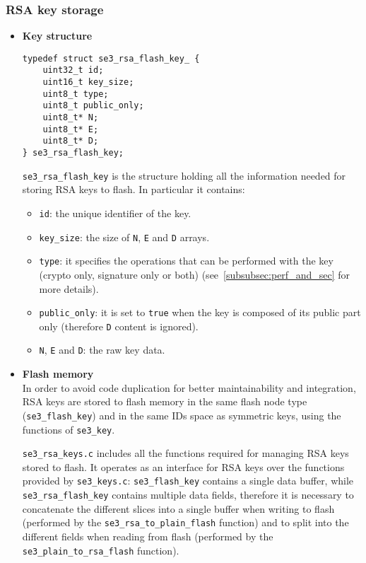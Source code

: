\subsubsection{RSA key storage}
\begin{itemize}
	\item \textbf{Key structure}
		\begin{lstlisting}
typedef struct se3_rsa_flash_key_ {
	uint32_t id;
	uint16_t key_size;
	uint8_t type;
	uint8_t public_only;
	uint8_t* N;
	uint8_t* E;
	uint8_t* D;
} se3_rsa_flash_key;
		\end{lstlisting}
		\texttt{se3\_rsa\_flash\_key} is the structure holding all the
		information needed for storing RSA keys to flash.
		In particular it contains:
		\begin{itemize}
			\item \texttt{id}: the unique identifier of the key.
			\item \texttt{key\_size}: the size of \texttt{N},
				\texttt{E} and \texttt{D} arrays.
			\item \texttt{type}: it specifies the operations that
				can be performed with the key (crypto only,
				signature only or both)
				(see~\ref{subsubsec:perf_and_sec} for more
				details).
			\item \texttt{public\_only}: it is set to \texttt{true}
				when the key is composed of its public part
				only (therefore \texttt{D} content is ignored).
			\item \texttt{N}, \texttt{E} and \texttt{D}: the raw key
				data.
		\end{itemize}

	\item \textbf{Flash memory} \\
		In order to avoid code duplication for better maintainability
		and integration, RSA keys are stored to flash memory in the same
		flash node type (\texttt{se3\_flash\_key}) and in the same IDs
		space as symmetric keys, using the functions of
		\texttt{se3\_key}.

		\bigskip
		\texttt{se3\_rsa\_keys.c} includes all the functions required
		for managing RSA keys stored to flash.
		It operates as an interface for RSA keys over the functions
		provided by \texttt{se3\_keys.c}: \texttt{se3\_flash\_key}
		contains a single data buffer, while
		\texttt{se3\_rsa\_flash\_key} contains multiple data fields,
		therefore it is necessary to concatenate the different slices
		into a single buffer when writing to flash
		(performed by the \texttt{se3\_rsa\_to\_plain\_flash} function)
		and to split into the different fields when reading from flash
		(performed by the \texttt{se3\_plain\_to\_rsa\_flash} function).
\end{itemize}

